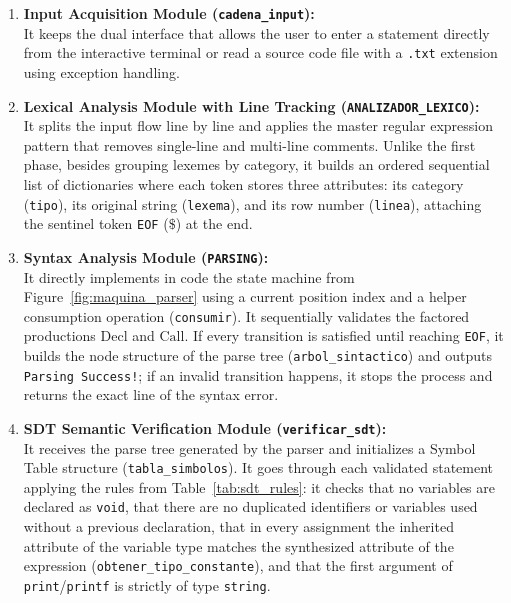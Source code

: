 \documentclass[letterpaper,12pt,oneside]{article}
\begin{document}
\begin{enumerate}
    \item \textbf{Input Acquisition Module (\texttt{cadena\_input}):} \\
    It keeps the dual interface that allows the user to enter a statement directly from the interactive terminal or read a source code file with a \texttt{.txt} extension using exception handling.

    \item \textbf{Lexical Analysis Module with Line Tracking (\texttt{ANALIZADOR\_LEXICO}):} \\
    It splits the input flow line by line and applies the master regular expression pattern that removes single-line and multi-line comments. Unlike the first phase, besides grouping lexemes by category, it builds an ordered sequential list of dictionaries where each token stores three attributes: its category (\texttt{tipo}), its original string (\texttt{lexema}), and its row number (\texttt{linea}), attaching the sentinel token \texttt{EOF} ($\$$) at the end.

    \item \textbf{Syntax Analysis Module (\texttt{PARSING}):} \\
    It directly implements in code the state machine from Figure~\ref{fig:maquina_parser} using a current position index and a helper consumption operation (\texttt{consumir}). It sequentially validates the factored productions $\text{Decl}$ and $\text{Call}$. If every transition is satisfied until reaching \texttt{EOF}, it builds the node structure of the parse tree (\texttt{arbol\_sintactico}) and outputs \texttt{Parsing Success!}; if an invalid transition happens, it stops the process and returns the exact line of the syntax error.

    \item \textbf{SDT Semantic Verification Module (\texttt{verificar\_sdt}):} \\
    It receives the parse tree generated by the parser and initializes a Symbol Table structure (\texttt{tabla\_simbolos}). It goes through each validated statement applying the rules from Table~\ref{tab:sdt_rules}: it checks that no variables are declared as \texttt{void}, that there are no duplicated identifiers or variables used without a previous declaration, that in every assignment the inherited attribute of the variable type matches the synthesized attribute of the expression (\texttt{obtener\_tipo\_constante}), and that the first argument of \texttt{print}/\texttt{printf} is strictly of type \texttt{string}.
\end{enumerate}
\end{document}
